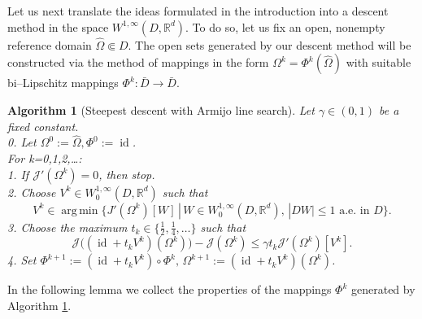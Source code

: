 \documentclass[a4paper,10pt]{article}
\newcommand{\Omref}{\hat \Omega}
\theoremstyle{plain}
\theoremstyle{plain}
\newtheorem{alg}{Algorithm}[section]
\numberwithin{equation}{section}
\DeclareMathOperator*{\argmin}{arg\,min}
\DeclareMathOperator{\id}{id}
\begin{document}
\noindent
Let us next translate the ideas formulated in the introduction
into a descent method in the space $W^{1,\infty}(D,\mathbb R^d)$.
To do so, let us fix an open, nonempty reference domain $\Omref \Subset D$. The open sets  generated by
our descent method will be constructed via the method of mappings
in the form $\Omega^k = \Phi^k(\Omref)$ with suitable 
bi--Lipschitz mappings  $\Phi^k:\bar D \rightarrow \bar D$. 


\begin{alg}[Steepest descent with Armijo line search]\label{alg:Steepest}
Let $\gamma \in (0,1)$ be a fixed constant. \\ [2mm]
0. Let $\Omega^0:= \Omref, \Phi^0:= \id$. \\[2mm]
For k=0,1,2,\ldots: \\[2mm]
1. If $\mathcal J'(\Omega^k)=0$, then stop. \\[2mm]
2. Choose $V^k \in  W^{1,\infty}_0(D, \mathbb R^d)$ such that 
\begin{displaymath}
V^k \in \argmin \lbrace J'(\Omega^k)[W] \, | \, W \in W^{1,\infty}_0(D, \mathbb R^d), \, | DW | \leq 1 \mbox{ a.e. in } D \rbrace.
\end{displaymath}
3. Choose the maximum $t_k \in \lbrace  \frac{1}{2}, \frac{1}{4}, \ldots \rbrace$ such that 
\begin{displaymath}
\mathcal J \bigl( (\id + t_k V^k)(\Omega^k) \bigr) - \mathcal J(\Omega^k) \leq \gamma t_k \mathcal J'(\Omega^k)[V^k].
\end{displaymath}
4. Set $\Phi^{k+1}:= (\id + t_k V^k )\circ \Phi^k, \, \Omega^{k+1}:= (\id+ t_k V^k)(\Omega^k)$.
\end{alg}

\vspace{2mm}
\noindent
In the following lemma we collect the properties of the mappings $\Phi^k$ generated by Algorithm \ref{alg:Steepest}.
\end{document}
